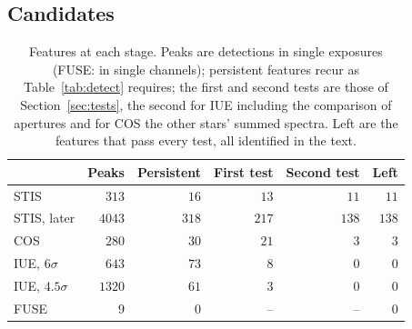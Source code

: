\documentclass[3p,11pt]{elsarticle}
\begin{document}
\subsection{Candidates}\label{sec:cand}

\begin{table}[t]
\centering\small
\setlength{\tabcolsep}{6pt}
\caption{Features at each stage. Peaks are detections in single exposures (FUSE: in
single channels); persistent features recur as Table~\ref{tab:detect} requires; the
first and second tests are those of Section~\ref{sec:tests}, the second for IUE
including the comparison of apertures and for COS the other stars' summed spectra. Left
are the features that pass every test, all identified in the text.}
\label{tab:stages}
\begin{tabular}{@{}lrrrrr@{}}
\toprule
 & Peaks & Persistent & First test & Second test & Left\\
\midrule
STIS & $313$ & $16$ & $13$ & $11$ & $11$\\
STIS, later & $4043$ & $318$ & $217$ & $138$ & $138$\\
COS & $280$ & $30$ & $21$ & $3$ & $3$\\
IUE, $6\sigma$ & $643$ & $73$ & $8$ & $0$ & $0$\\
IUE, $4.5\sigma$ & $1320$ & $61$ & $3$ & $0$ & $0$\\
FUSE & $9$ & $0$ & -- & -- & $0$\\
\bottomrule
\end{tabular}
\end{table}
\end{document}
